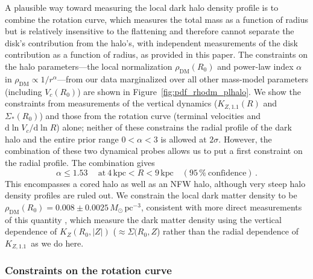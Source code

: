 \documentclass{emulateapj}
\newcommand{\dd}{\mathrm{d}}
\newcommand{\eg}{e.g.}
\renewcommand{\figurename}{Figure}
\newcommand{\kpc}{\ensuremath{\,\mathrm{kpc}}}
\newcommand{\pc}{\ensuremath{\,\mathrm{pc}}}
\newcommand{\kzoneone}{\ensuremath{K_{Z,1.1}}}
\begin{document}
A plausible way toward measuring the local dark halo density profile
is to combine the rotation curve, which measures the total mass as a
function of radius but is relatively insensitive to the flattening and
therefore cannot separate the disk's contribution from the halo's,
with independent measurements of the disk contribution as a function
of radius, as provided in this paper. The constraints on the halo
parameters---the local normalization $\rho_{\mathrm{DM}}(R_0)$ and
power-law index $\alpha$ in $\rho_{\mathrm{DM}} \propto 1 /
r^\alpha$---from our data marginalized over all other mass-model
parameters (including $V_c(R_0)$) are shown in
\figurename~\ref{fig:pdf_rhodm_plhalo}. We show the constraints from
measurements of the vertical dynamics ($\kzoneone(R)$ and
$\Sigma_*(R_0)$) and those from the rotation curve (terminal
velocities and $\dd \ln V_c / \dd \ln R$) alone; neither of these
constrains the radial profile of the dark halo and the entire prior
range $0 < \alpha < 3$ is allowed at $2\sigma$. However, the
combination of these two dynamical probes allows us to put a first
constraint on the radial profile. The combination gives
\begin{equation}
  \alpha \leq 1.53\quad\ \mathrm{at}\ 4\kpc<R<9\kpc\quad (\mathrm{95\,\%\ confidence})\,.
\end{equation}
This encompasses a cored halo as well as an NFW halo, although very
steep halo density profiles are ruled out. We constrain the local dark
matter density to be $\rho_{\mathrm{DM}}(R_0) =
0.008\pm0.0025\,M_\odot\pc^{-3}$, consistent with more direct
measurements of this quantity \citep[\eg,][]{BovyTremaine,Zhang13a},
which measure the dark matter density using the vertical dependence of
$K_Z(R_0,|Z|)$ ($\approx \Sigma(R_0,Z$) rather than the radial
dependence of \kzoneone\ as we do here.

\subsubsection{Constraints on the rotation curve}
\end{document}
